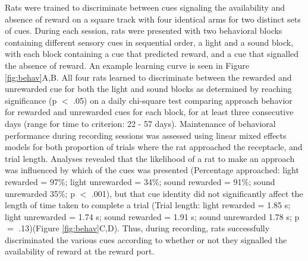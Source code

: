 \documentclass[11pt]{article}
\begin{document}
Rats were trained to discriminate between cues signaling the availability and absence of reward on a square track with four identical arms for two distinct sets of cues. During each session, rats were presented with two behavioral blocks containing different sensory cues in sequential order, a light and a sound block, with each block containing a cue that predicted reward, and a cue that signalled the absence of reward. An example learning curve is seen in Figure \ref{fig:behav}A,B. All four rats learned to discriminate between the rewarded and unrewarded cue for both the light and sound blocks as determined by reaching significance (p $<$ .05) on a daily chi-square test comparing approach behavior for rewarded and unrewarded cues for each block, for at least three consecutive days (range for time to criterion: 22 - 57 days). Maintenance of behavioral performance during recording sessions was assessed using linear mixed effects models for both proportion of trials where the rat approached the receptacle, and trial length. Analyses revealed that the likelihood of a rat to make an approach was influenced by which of the cues was presented (Percentage approached: light rewarded = 97\%; light unrewarded = 34\%; sound rewarded = 91\%; sound unrewarded 35\%; p $<$ .001), but that cue identity did not significantly affect the length of time taken to complete a trial (Trial length: light rewarded = 1.85 s; light unrewarded = 1.74 s; sound rewarded = 1.91 s; sound unrewarded 1.78 s; p $=$ .13)(Figure \ref{fig:behav}C,D). Thus, during recording, rats successfully discriminated the various cues according to whether or not they signalled the availability of reward at the reward port.
\end{document}
